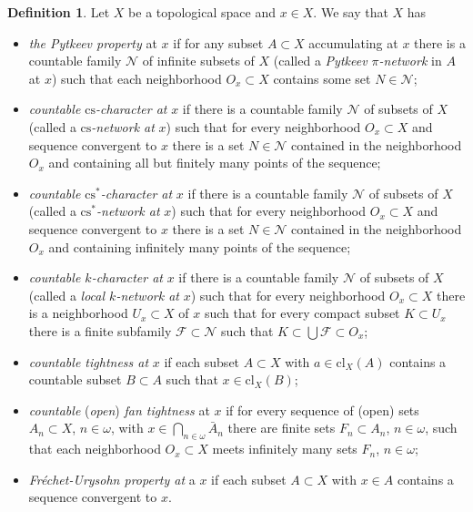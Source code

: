 \documentclass{amsart}
\theoremstyle{definition}
\newtheorem{definition}[theorem]{Definition}
\begin{document}
\begin{definition} Let $X$ be a topological space and $x\in X$. We say that $X$ has
\begin{itemize}
\item {\em the Pytkeev property} at $x$ if for any subset $A\subset X$ accumulating at $x$ there is a countable family $\mathcal N$ of infinite subsets of $X$ (called a {\em Pytkeev $\pi$-network} in $A$ at $x$) such that each neighborhood $O_x\subset X$ contains some set $N\in\mathcal N$;
\item {\em countable ${\mathrm{cs}}$-character at} $x$ if there is a countable family $\mathcal N$ of subsets of $X$ (called a {\em ${\mathrm{cs}}$-network at} $x$) such that for every neighborhood $O_x\subset X$ and sequence convergent to $x$ there is a set $N\in\mathcal N$ contained in the neighborhood $O_x$ and containing all but finitely many points of the sequence;
\item {\em countable ${\mathrm{cs}}^*$-character at} $x$ if there is a countable family $\mathcal N$ of subsets of $X$ (called a {\em ${\mathrm{cs}}^*$-network at} $x$) such that for every neighborhood $O_x\subset X$ and sequence convergent to $x$ there is a set $N\in\mathcal N$ contained in the neighborhood $O_x$ and containing infinitely many points of the sequence;
\item {\em countable $k$-character at} $x$ if there is a countable family $\mathcal N$ of subsets of $X$ (called a {\em local $k$-network at} $x$) such that for every neighborhood $O_x\subset X$ there is a neighborhood $U_x\subset X$ of $x$ such that for every compact subset $K\subset U_x$ there is a finite subfamily ${\mathcal F}\subset\mathcal N$ such that $K\subset\bigcup{\mathcal F}\subset O_x$;
\smallskip

\item {\em countable tightness at} $x$ if each subset $A\subset X$ with $a\in {\mathrm{cl}}_X(A)$ contains a countable subset $B\subset A$ such that $x\in {\mathrm{cl}}_X(B)$;
\item {\em countable} ({\em open}) {\em fan tightness} at $x$ if for every sequence of (open) sets $A_n\subset X$, $n\in{\omega}$,  with $x\in\bigcap_{n\in{\omega}}\bar A_n$ there are finite sets $F_n\subset A_n$, $n\in{\omega}$, such that each neighborhood $O_x\subset X$ meets infinitely many sets $F_n$, $n\in{\omega}$;
\item {\em Fr\'echet-Urysohn property at} a $x$ if each subset $A\subset X$ with $x\in A$ contains a sequence convergent to $x$.
\end{itemize}
\end{definition}
\end{document}
